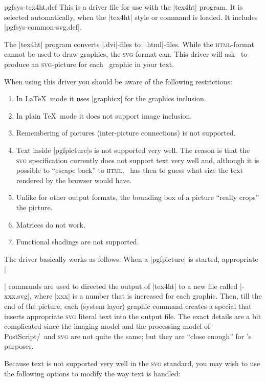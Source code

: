 \begin{filedescription}{pgfsys-tex4ht.def}
  This is a driver file for use with the |tex4ht| program. It is
  selected automatically, when the |tex4ht| style or command is
  loaded. It includes |pgfsys-common-svg.def|.
  
  The |tex4ht| program converts |.dvi|-files to |.html|-files. While the
  \textsc{html}-format cannot be used to draw graphics, the
  \textsc{svg}-format can. This driver will ask
  \pgfname\ to produce an \textsc{svg}-picture for each \pgfname\
  graphic in your text.

  When using this driver you should be aware of the following
  restrictions:
  \begin{enumerate}
  \item
    In \LaTeX\ mode it uses |graphicx| for the graphics
    inclusion.
  \item
    In plain \TeX\ mode it does not support image inclusion.
  \item
    Remembering of pictures (inter-picture connections) is not
    supported.
  \item
    Text inside |pgfpicture|s is not supported very well. The reason
    is that the \textsc{svg} specification currently does not support
    text very well and, although it is  possible to ``escape
    back'' to \textsc{html}, \tikzname\ has then to guess what size the text
    rendered by the browser would have.
  \item
    Unlike for other output formats, the bounding box of a picture
    ``really crops'' the picture.
  \item
    Matrices do not work.
  \item
    Functional shadings are not supported.
  \end{enumerate}

  The driver basically works as follows: When a |{pgfpicture}| is
  started, appropriate |\special| commands are used to directed the
  output of |tex4ht| to a new file called |\jobname-xxx.svg|, where
  |xxx| is a number that is increased for each graphic. Then, till the
  end of the picture, each (system layer) graphic command creates a
  special that inserts appropriate \textsc{svg} literal text into the
  output file. The exact details are a bit complicated since the
  imaging model and the processing model of PostScript/\pdf\ and
  \textsc{svg} are not quite the same; but they are ``close enough''
  for \pgfname's purposes.

  Because text is not supported very well in the
  \textsc{svg} standard, you may wish to use the following options to
  modify the way text is handled:


\end{filedescription}
